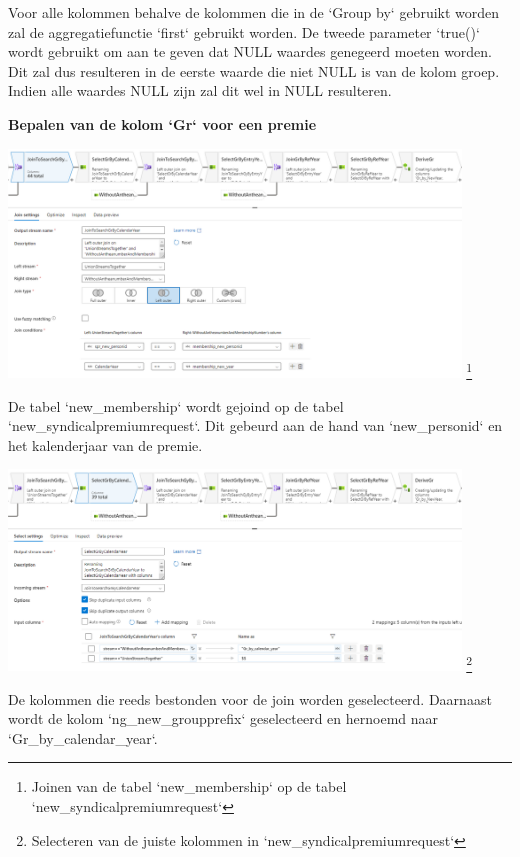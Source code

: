 Voor alle kolommen behalve de kolommen die in de `Group by` gebruikt worden zal de aggregatiefunctie `first` gebruikt worden. De tweede parameter `true()` wordt gebruikt om aan te geven dat NULL waardes genegeerd moeten worden. Dit zal dus resulteren in de eerste waarde die niet NULL is van de kolom groep. Indien alle waardes NULL zijn zal dit wel in NULL resulteren.



\textbf{Bepalen van de kolom `Gr` voor een premie}

\begin{center}
    \includegraphics[width=0.9\textwidth]{./graphics/adf/gr_1.png}
    \footnote{Joinen van de tabel `new\_membership` op de tabel `new\_syndicalpremiumrequest`}
\end{center}

De tabel `new\_membership` wordt gejoind op de tabel `new\_syndicalpremiumrequest`. Dit gebeurd aan de hand van `new\_personid` en het kalenderjaar van de premie.

\begin{center}
    \includegraphics[width=0.9\textwidth]{./graphics/adf/gr_2.png}
    \footnote{Selecteren van de juiste kolommen in `new\_syndicalpremiumrequest`}
\end{center}

De kolommen die reeds bestonden voor de join worden geselecteerd. Daarnaast wordt de kolom `ng\_new\_groupprefix` geselecteerd en hernoemd naar `Gr\_by\_calendar\_year`.

